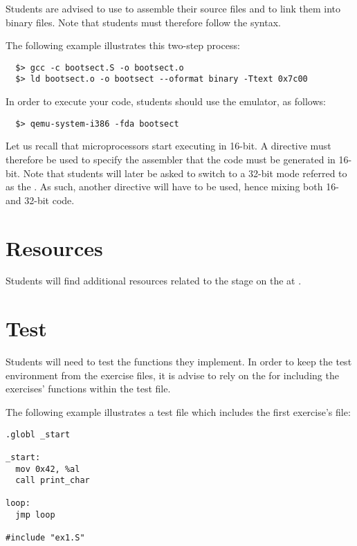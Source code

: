 Students are advised to use  to assemble
their source files and  to link them into binary files. Note
that students must therefore follow the  syntax.

The following example illustrates this two-step process:

\begin{verbatim}
  $> gcc -c bootsect.S -o bootsect.o
  $> ld bootsect.o -o bootsect --oformat binary -Ttext 0x7c00
\end{verbatim}

In order to execute your code, students should use the  emulator,
as follows:

\begin{verbatim}
  $> qemu-system-i386 -fda bootsect
\end{verbatim}

Let us recall that  microprocessors start executing in 16-bit. A
directive must therefore be used to specify the assembler that the code
must be generated in 16-bit. Note that students will later be asked to
switch to a 32-bit mode referred to as the . As such,
another directive will have to be used, hence mixing both 16- and 32-bit
code.

%
%

\section{Resources}

Students will find additional resources related to the  stage
on the  at .

%
%

\section{Test}

Students will need to test the functions they implement. In order to keep
the test environment from the exercise files, it is advise to rely on
the  for including the exercises' functions
within the test file.

The following example illustrates a test file which includes the first
exercise's file:

\begin{verbatim}
.globl _start

_start:
  mov 0x42, %al
  call print_char

loop:
  jmp loop

#include "ex1.S"
\end{verbatim}

